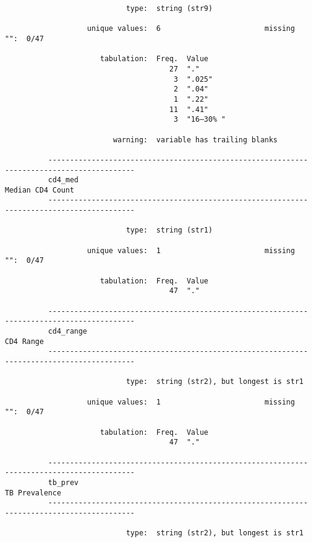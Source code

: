 \documentclass{article}
\begin{document}
\begin{verbatim}
                            type:  string (str9)
          
                   unique values:  6                        missing "":  0/47
          
                      tabulation:  Freq.  Value
                                      27  "."
                                       3  ".025"
                                       2  ".04"
                                       1  ".22"
                                      11  ".41"
                                       3  "16–30% "
          
                         warning:  variable has trailing blanks
          
          ------------------------------------------------------------------------------------------
          cd4_med                                                                   Median CD4 Count
          ------------------------------------------------------------------------------------------
          
                            type:  string (str1)
          
                   unique values:  1                        missing "":  0/47
          
                      tabulation:  Freq.  Value
                                      47  "."
          
          ------------------------------------------------------------------------------------------
          cd4_range                                                                        CD4 Range
          ------------------------------------------------------------------------------------------
          
                            type:  string (str2), but longest is str1
          
                   unique values:  1                        missing "":  0/47
          
                      tabulation:  Freq.  Value
                                      47  "."
          
          ------------------------------------------------------------------------------------------
          tb_prev                                                                      TB Prevalence
          ------------------------------------------------------------------------------------------
          
                            type:  string (str2), but longest is str1
          

\end{verbatim}
\end{document}
